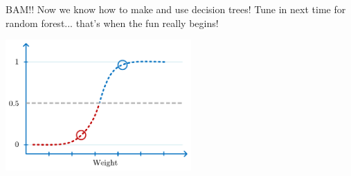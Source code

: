 \documentclass[
	final,
	a4paper,
	oneside,
	parskip=full,
	headings=standardclasses,
	headings=big,
	pointednumbers
]{scrartcl}
\begin{document}
        BAM!! Now we know how to make and use decision trees!
        Tune in next time for random forest... that's when the fun really begins!



    \begin{center}
        \includegraphics[height=5cm]{StatQuest_ROC_and_AUC_Obese_Threshold.pdf}
    \end{center}



    
\end{document}
